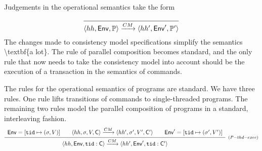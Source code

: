 \documentclass[a4paper,UKenglish]{article}%
\theoremstyle{plain}
\begin{document}
Judgements in the operational semantics take the form 

\[
\infer{\langle \hh, \mathsf{Env}, \prog \rangle \xrightarrow{CM} \langle \hh', \mathsf{Env}', \prog' \rangle}{}
\]
\ac{The changes made to consistency model specifications simplify the semantics \textbf{a lot}. The rule of parallel 
composition becomes standard, and the only rule that now needs to take the consistency model into account 
should be the execution of a transaction in the semantics of commands.}

The rules for the operational semantics of programs are standard. We have three rules. One rule lifts transitions
 of commands to single-threaded programs.  The remaining two rules model the parallel composition of programs in 
 a standard, interleaving fashion.
\[
\infer[{\scriptstyle(P-thd-exec)}]{\langle \hh, \mathsf{Env}, \tid: \cmd \rangle \xrightarrow{CM} \langle \hh', \mathsf{Env}', \tid: \cmd' \rangle}
{
\begin{array}{c}
\mathsf{Env} = [\tid \mapsto (\sigma, V)] \qquad \langle \hh, \thdstack, V, \cmd \rangle \xrightarrow{CM} \langle \hh', \thdstack', V', \cmd' \rangle 
\qquad \mathsf{Env}' = [\tid \mapsto (\sigma', V')]\\
\end{array}
}
\]
\end{document}
